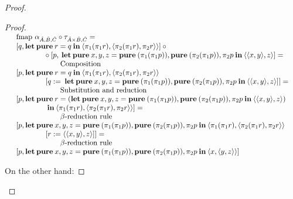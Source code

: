 \documentclass[a4paper]{article}
\begin{document}
\begin{proof}
\begin{proof}
$\begin{array}{lll}
&\text{fmap } \alpha_{\hat{A},\hat{B},\hat{C}} \circ \tau_{\hat{A} \times \hat{B}, \hat{C}} = & \\
&[q, {\bf let \: pure \:} r = q {\: \bf in \:}  \langle \pi_1 (\pi_1 r), \langle \pi_2 (\pi_1 r), \pi_2 r \rangle \rangle] \: \circ & \\
&\quad\quad\quad\quad \circ \: [p, {\bf \: let \: pure \:} x,y,z = {\bf pure\:} (\pi_1 (\pi_1 p)), {\bf pure \:} (\pi_2 (\pi_1 p)), \pi_2 p {\: \bf in \:} \langle \langle x,y \rangle, z \rangle] = & \\
&\quad\quad\quad\quad\quad\quad \text{Composition}& \\
&[p, {\bf let \: pure \:} r = q {\: \bf in \:}  \langle \pi_1 (\pi_1 r), \langle \pi_2 (\pi_1 r), \pi_2 r \rangle \rangle & \\
&\quad\quad\quad\quad [q := {\bf \: let \: pure \:} x,y,z = {\bf pure\:} (\pi_1 (\pi_1 p)), {\bf pure \:} (\pi_2 (\pi_1 p)), \pi_2 p {\: \bf in \:} \langle \langle x,y \rangle, z \rangle]] = & \\
&\quad\quad\quad\quad\quad\quad \text{Substitution and reduction}& \\
&[p, {\bf let \: pure \:} r = ({\bf let \: pure \:} x,y,z = {\bf pure\:} (\pi_1 (\pi_1 p)), {\bf pure \:} (\pi_2 (\pi_1 p)), \pi_2 p {\: \bf in \:} \langle \langle x,y \rangle, z \rangle) & \\
&\quad\quad\quad\quad {\: \bf in \:} \langle \pi_1 (\pi_1 r), \langle \pi_2 (\pi_1 r), \pi_2 r \rangle \rangle] = & \\
&\quad\quad\quad\quad\quad\quad \text{$\beta$-reduction rule}& \\
&[p, {\bf let \: pure \:} x,y,z = {\bf pure\:} (\pi_1 (\pi_1 p)), {\bf pure \:} (\pi_2 (\pi_1 p)), \pi_2 p {\: \bf in \:}  \langle \pi_1 (\pi_1 r), \langle \pi_2 (\pi_1 r), \pi_2 r \rangle \rangle & \\
&\quad\quad\quad\quad [r := \langle \langle x,y \rangle, z \rangle]] = & \\
&\quad\quad\quad\quad\quad\quad \text{$\beta$-reduction rule}& \\
&[p, {\bf let \: pure \:} x,y,z = {\bf pure\:} (\pi_1 (\pi_1 p)), {\bf pure \:} (\pi_2 (\pi_1 p)), \pi_2 p {\: \bf in \:} \langle x, \langle y, z \rangle \rangle]&
\end{array}$

\vspace{\baselineskip}

On the other hand:


\end{proof}
\end{proof}
\end{document}
